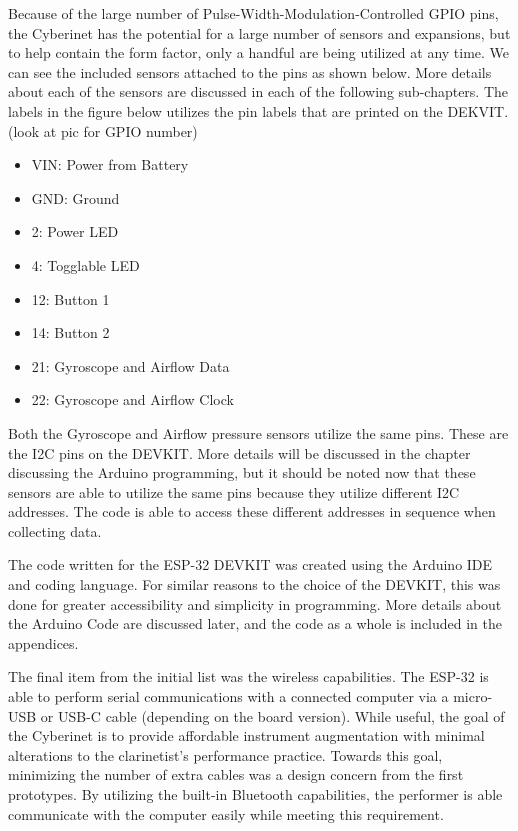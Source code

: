 Because of the large number of Pulse-Width-Modulation-Controlled GPIO pins, the Cyberinet has the potential for a large number of sensors and expansions, but to help contain the form factor, only a handful are being utilized at any time. We can see the included sensors attached to the pins as shown below. More details about each of the sensors are discussed in each of the following sub-chapters. The labels in the figure below utilizes the pin labels that are printed on the DEKVIT. (look at pic for GPIO number)

\begin{itemize}
    \item VIN: Power from Battery
    \item GND: Ground
    \item 2: Power LED
    \item 4: Togglable LED
    \item 12: Button 1
    \item 14: Button 2
    \item 21: Gyroscope and Airflow Data
    \item 22: Gyroscope and Airflow Clock
\end{itemize}

Both the Gyroscope and Airflow pressure sensors utilize the same pins. These are the I2C pins on the DEVKIT. More details will be discussed in the chapter discussing the Arduino programming, but it should be noted now that these sensors are able to utilize the same pins because they utilize different I2C addresses. The code is able to access these different addresses in sequence when collecting data.

The code written for the ESP-32 DEVKIT was created using the Arduino IDE and coding language. For similar reasons to the choice of the DEVKIT, this was done for greater accessibility and simplicity in programming. More details about the Arduino Code are discussed later, and the code as a whole is included in the appendices.

The final item from the initial list was the wireless capabilities. The ESP-32 is able to perform serial communications with a connected computer via a micro-USB or USB-C cable (depending on the board version). While useful, the goal of the Cyberinet is to provide affordable instrument augmentation with minimal alterations to the clarinetist's performance practice. Towards this goal, minimizing the number of extra cables was a design concern from the first prototypes. By utilizing the built-in Bluetooth capabilities, the performer is able communicate with the computer easily while meeting this requirement.


